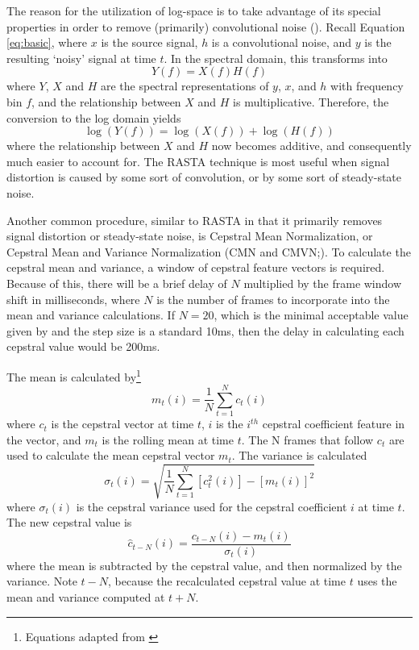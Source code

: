 The reason for the utilization of log-space is to take advantage of its special properties in order to remove (primarily) convolutional noise (\cite{gold:11}).  Recall Equation \ref{eq:basic}, where $x$ is the source signal, $h$ is a convolutional noise, and $y$ is the resulting `noisy' signal at time $t$.  In the spectral domain, this transforms into \begin{equation} Y(f) = X(f)H(f) \end{equation} where $Y$, $X$ and $H$ are the spectral representations of $y$, $x$, and $h$ with frequency bin $f$, and the relationship between $X$ and $H$ is multiplicative.  Therefore, the conversion to the log domain yields \begin{equation} \log(Y(f)) = \log(X(f)) + \log(H(f)) \end{equation} where the relationship between $X$ and $H$ now becomes additive, and consequently much easier to account for.  The RASTA technique is most useful when signal distortion is caused by some sort of convolution, or by some sort of steady-state noise.

Another common procedure, similar to RASTA in that it primarily removes signal distortion or steady-state noise, is Cepstral Mean Normalization, or Cepstral Mean and Variance Normalization (CMN and CMVN;\cite{atal:74,viikki:98}).  To calculate the cepstral mean and variance, a window of cepstral feature vectors is required.  Because of this, there will be a brief delay of $N$ multiplied by the frame window shift in milliseconds, where $N$ is the number of frames to incorporate into the mean and variance calculations.  If $N=20$, which is the minimal acceptable value given by \cite{viikki:98} and the step size is a standard 10ms, then the delay in calculating each cepstral value would be 200ms.

The mean is calculated by\footnote{Equations adapted from \cite{viikki:98}} \begin{equation} m_t(i) = \dfrac{1}{N}\sum_{t=1}^{N} c_t(i) \end{equation} where $c_t$ is the cepstral vector at time $t$, $i$ is the $i^{th}$ cepstral coefficient feature in the vector, and $m_t$ is the rolling mean at time $t$.  The N frames that follow $c_t$ are used to calculate the mean cepstral vector $m_t$.  The variance is calculated \begin{equation} \sigma_t(i) = \sqrt{\dfrac{1}{N}\sum_{t=1}^{N} [c_t^2(i)] - [m_t(i)]^2} \end{equation} where $\sigma_t(i)$ is the cepstral variance used for the cepstral coefficient $i$ at time $t$.  The new cepstral value is \begin{equation} \hat{c}_{t-N}(i) =  \dfrac{c_{t-N}(i) - m_t(i)}{\sigma_{t}(i)} \end{equation} where the mean is subtracted by the cepstral value, and then normalized by the variance.  Note $t-N$, because the recalculated cepstral value at time $t$ uses the mean and variance computed at $t+N$.

